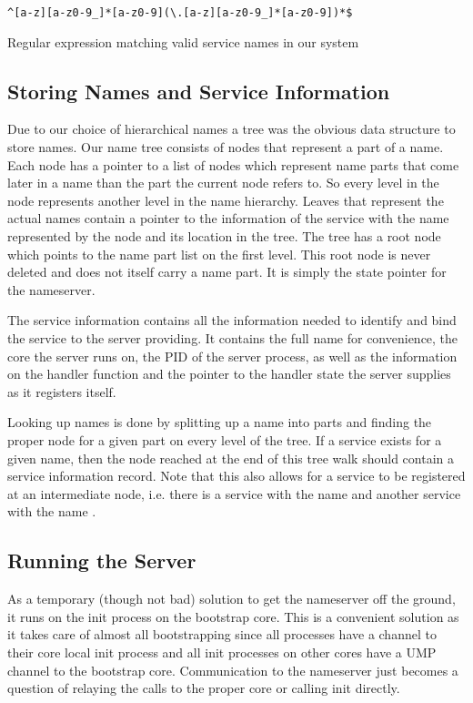 \begin{listing}
\begin{verbatim}
^[a-z][a-z0-9_]*[a-z0-9](\.[a-z][a-z0-9_]*[a-z0-9])*$
\end{verbatim}
\caption{Regular expression matching valid service names in our system}
\label{lst:name-regex}
\end{listing}

\subsection{Storing Names and Service Information}
Due to our choice of hierarchical names a tree was the obvious data structure to store names. Our name tree
consists of nodes that represent a part of a name. Each node has a pointer to a list of nodes which 
represent name parts that come later in a name than the part the current node refers to. So every level in
the node represents another level in the name hierarchy. Leaves that represent the actual names contain a
pointer to the information of the service with the name represented by the node and its location in the tree.
The tree has a root node which points to the name part list on the first level. This root node is never
deleted and does not itself carry a name part. It is simply the state pointer for the nameserver.

The service information contains all the information needed to identify and bind the service to the server providing. It contains the full name for convenience, the core the server runs on, the PID of the server
process, as well as the information on the handler function and the pointer to the handler state the server
supplies as it registers itself.

Looking up names is done by splitting up a name into parts and finding the proper node for a given part on
every level of the tree. If a service exists for a given name, then the node reached at the end of this
tree walk should contain a service information record. Note that this also allows for a service to be registered
at an intermediate node, i.e. there is a service with the name  and another service
with the name .

\subsection{Running the Server}
As a temporary (though not bad) solution to get the nameserver off the ground, it runs on the
init process on the bootstrap core. This is a convenient solution as it takes care of almost all bootstrapping
since all processes have a channel to their core local init process and all init processes on other cores
have a UMP channel to the bootstrap core. Communication to the nameserver just becomes a question of
relaying the calls to the proper core or calling init directly.

